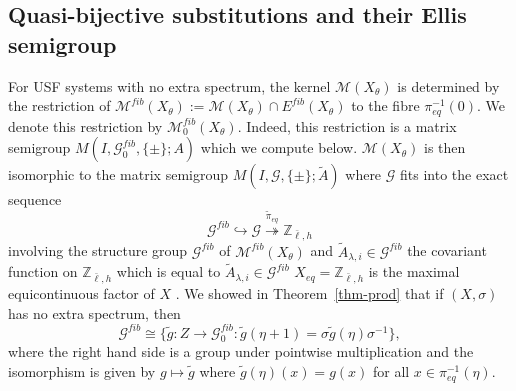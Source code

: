 \documentclass[12pt]{amsart}
\theoremstyle{definition}
\numberwithin{equation}{section}
\newcommand{\Z}{\mathbb Z}
\newcommand{\Gg}{{\mathcal G}}
\newcommand{\Mm}{{\mathcal M}}
\newcommand{\Xe}{X_{eq}}
\newcommand{\pe}{\pi_{eq}}
\newcommand{\M}{\mathcal M}
\newcommand{\Ef}{E^{fib}}
\begin{document}
\subsection{Quasi-bijective substitutions and their Ellis semigroup}\label{bijective}








For USF systems with no extra spectrum, the kernel $\M(X_\theta)$ is determined by the restriction of $\Mm^{fib}(X_\theta):=\Mm(X_\theta)\cap \Ef(X_\theta)$ to the fibre $\pe^{-1}(0)$. We denote this restriction by $\Mm^{fib}_0(X_\theta)$. Indeed, this restriction is a matrix semigroup $M(I,\Gg_0^{fib},\{\pm\};A)$ which we compute below.  $\M(X_\theta)$  is then  isomorphic to the matrix semigroup $M(I,\Gg,\{\pm\};\tilde A)$ where $\Gg$ fits into the exact sequence
\begin{equation*}%
\Gg^{fib} \hookrightarrow  \Gg \stackrel{\widetilde\pe} \twoheadrightarrow 
\Z_{\bar{\ell},h}
\end{equation*}
involving the structure group $\Gg^{fib}$ of $\Mm^{fib}(X_\theta)$ and 
$\tilde A_{\lambda,i} \in\Gg^{fib}$ the covariant function on $\Z_{\bar{\ell},h}$ which is equal to $\tilde A_{\lambda,i} \in\Gg^{fib}$
$\Xe=\Z_{\bar{\ell},h}$ is the maximal equicontinuous factor of $X$ \cite{ESBS}. 
 We showed in Theorem~\ref{thm-prod} that if $(X,\sigma)$ has no extra spectrum, then  
$$\Gg^{fib} \cong \{\tilde g:Z\to \Gg_0^{fib}:\tilde g(\eta+1) = \sigma \tilde g(\eta) \sigma^{-1}\},$$
where the right hand side is a group under pointwise multiplication and the isomorphism is given by $g\mapsto \tilde g$ where $\tilde g(\eta)(x) = g(x)$ for all $x\in \pe^{-1}(\eta)$. 

%
\end{document}
